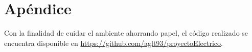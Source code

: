 \chapter{Apéndice}
Con la finalidad de cuidar el ambiente ahorrando papel, el código realizado se encuentra disponible en \url{https://github.com/aglt93/proyectoElectrico}.